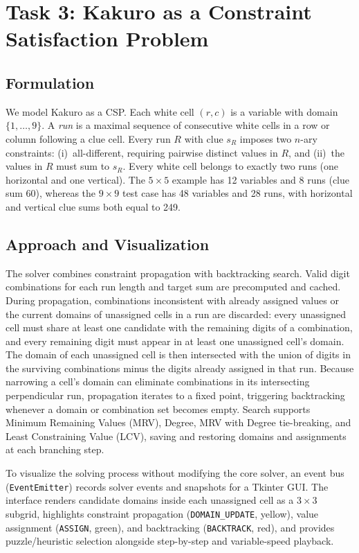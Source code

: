 \section{Task 3: Kakuro as a Constraint Satisfaction Problem}

\subsection{Formulation}
We model Kakuro as a CSP. Each white cell $(r,c)$ is a variable with domain $\{1,\dots,9\}$. A \emph{run} is a maximal sequence of consecutive white cells in a row or column following a clue cell. Every run $R$ with clue $s_R$ imposes two $n$-ary constraints: (i)~all-different, requiring pairwise distinct values in $R$, and (ii)~the values in $R$ must sum to $s_R$. Every white cell belongs to exactly two runs (one horizontal and one vertical). The $5\times5$ example has 12 variables and 8 runs (clue sum 60), whereas the $9\times9$ test case has 48 variables and 28 runs, with horizontal and vertical clue sums both equal to 249.

\subsection{Approach and Visualization}
The solver combines constraint propagation with backtracking search. Valid digit combinations for each run length and target sum are precomputed and cached. During propagation, combinations inconsistent with already assigned values or the current domains of unassigned cells in a run are discarded: every unassigned cell must share at least one candidate with the remaining digits of a combination, and every remaining digit must appear in at least one unassigned cell's domain. The domain of each unassigned cell is then intersected with the union of digits in the surviving combinations minus the digits already assigned in that run. Because narrowing a cell's domain can eliminate combinations in its intersecting perpendicular run, propagation iterates to a fixed point, triggering backtracking whenever a domain or combination set becomes empty. Search supports Minimum Remaining Values (MRV), Degree, MRV with Degree tie-breaking, and Least Constraining Value (LCV), saving and restoring domains and assignments at each branching step.

To visualize the solving process without modifying the core solver, an event bus (\texttt{EventEmitter}) records solver events and snapshots for a Tkinter GUI. The interface renders candidate domains inside each unassigned cell as a $3\times3$ subgrid, highlights constraint propagation (\texttt{DOMAIN\_UPDATE}, yellow), value assignment (\texttt{ASSIGN}, green), and backtracking (\texttt{BACKTRACK}, red), and provides puzzle/heuristic selection alongside step-by-step and variable-speed playback.

